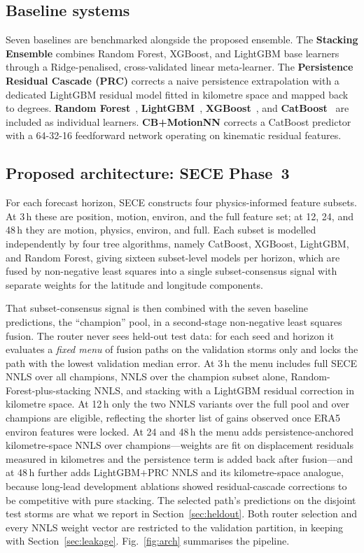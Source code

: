 \documentclass[10pt,twocolumn,a4paper]{article}
\newcommand{\sece}{SECE}
\newcommand{\era}{ERA5}
\begin{document}
\subsection{Baseline systems}
Seven baselines are benchmarked alongside the proposed ensemble. The
\textbf{Stacking Ensemble} combines Random Forest, XGBoost, and LightGBM base
learners through a Ridge-penalised, cross-validated linear meta-learner. The
\textbf{Persistence Residual Cascade (PRC)} corrects a naive persistence
extrapolation with a dedicated LightGBM residual model fitted in kilometre space
and mapped back to degrees. \textbf{Random Forest}~\cite{breiman2001rf},
\textbf{LightGBM}~\cite{ke2017lightgbm}, \textbf{XGBoost}~\cite{chen2016xgboost},
and \textbf{CatBoost}~\cite{prokhorenkova2018catboost} are included as individual
learners. \textbf{CB+MotionNN} corrects a CatBoost predictor with a 64-32-16
feedforward network operating on kinematic residual features.

\subsection{Proposed architecture: SECE Phase~3}
For each forecast horizon, \sece{} constructs four physics-informed feature
subsets. At 3\,h these are position, motion, environ, and the full feature set;
at 12, 24, and 48\,h they are motion, physics, environ, and full. Each subset is
modelled independently by four tree algorithms, namely CatBoost, XGBoost,
LightGBM, and Random Forest, giving sixteen subset-level models per horizon,
which are fused by non-negative least squares into a single subset-consensus
signal with separate weights for the latitude and longitude components.

That subset-consensus signal is then combined with the seven baseline
predictions, the ``champion'' pool, in a second-stage non-negative least squares
fusion. The router never sees held-out test data: for each seed and horizon it
evaluates a \emph{fixed menu} of fusion paths on the validation storms only and
locks the path with the lowest validation median error. At 3\,h the menu includes
full \sece{} NNLS over all champions, NNLS over the champion subset alone,
Random-Forest-plus-stacking NNLS, and stacking with a LightGBM residual correction
in kilometre space. At 12\,h only the two NNLS variants over the full pool and
over champions are eligible, reflecting the shorter list of gains observed once
\era{} environ features were locked. At 24 and 48\,h the menu adds
persistence-anchored kilometre-space NNLS over champions---weights are fit on
displacement residuals measured in kilometres and the persistence term is added
back after fusion---and at 48\,h further adds LightGBM$+$PRC NNLS and its
kilometre-space analogue, because long-lead development ablations showed
residual-cascade corrections to be competitive with pure stacking. The selected
path's predictions on the disjoint test storms are what we report in
Section~\ref{sec:heldout}. Both router selection and every NNLS weight vector are
restricted to the validation partition, in keeping with Section~\ref{sec:leakage}.
Fig.~\ref{fig:arch} summarises the pipeline.
\end{document}
